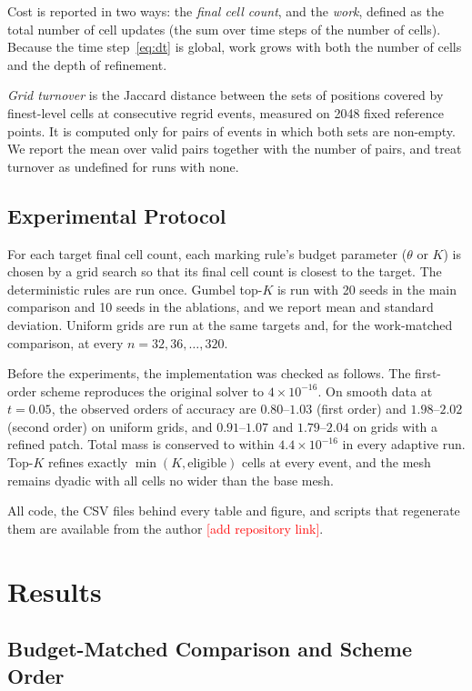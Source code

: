 \documentclass[conference]{IEEEtran}
\begin{document}
Cost is reported in two ways: the \emph{final cell count}, and the \emph{work}, defined as the total number of cell updates (the sum over time steps of the number of cells). Because the time step~\eqref{eq:dt} is global, work grows with both the number of cells and the depth of refinement.

\emph{Grid turnover} is the Jaccard distance between the sets of positions covered by finest-level cells at consecutive regrid events, measured on 2048 fixed reference points. It is computed only for pairs of events in which both sets are non-empty. We report the mean over valid pairs together with the number of pairs, and treat turnover as undefined for runs with none.

\subsection{Experimental Protocol}

For each target final cell count, each marking rule's budget parameter ($\theta$ or $K$) is chosen by a grid search so that its final cell count is closest to the target. The deterministic rules are run once. Gumbel top-$K$ is run with 20 seeds in the main comparison and 10 seeds in the ablations, and we report mean and standard deviation. Uniform grids are run at the same targets and, for the work-matched comparison, at every $n = 32, 36, \ldots, 320$.

Before the experiments, the implementation was checked as follows. The first-order scheme reproduces the original solver to $4\times10^{-16}$. On smooth data at $t = 0.05$, the observed orders of accuracy are $0.80$--$1.03$ (first order) and $1.98$--$2.02$ (second order) on uniform grids, and $0.91$--$1.07$ and $1.79$--$2.04$ on grids with a refined patch. Total mass is conserved to within $4.4\times10^{-16}$ in every adaptive run. Top-$K$ refines exactly $\min(K, \text{eligible})$ cells at every event, and the mesh remains dyadic with all cells no wider than the base mesh.

All code, the CSV files behind every table and figure, and scripts that regenerate them are available from the author \textcolor{red}{[add repository link]}.

\section{Results}
\label{sec:results}

\subsection{Budget-Matched Comparison and Scheme Order}
\end{document}
